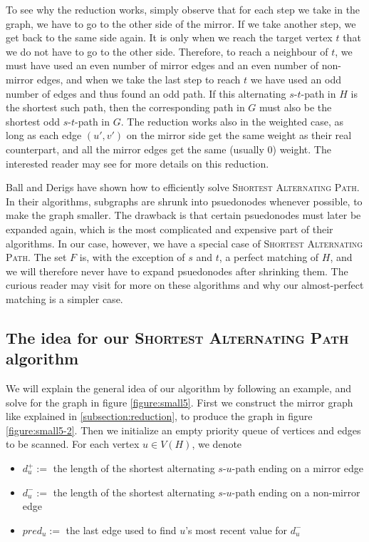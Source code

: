 To see why the reduction works, simply observe that for each step we take in the graph, we have to go to the other side of the mirror. If we take another step, we get back to the same side again. It is only when we reach the target vertex $t$ that we do not have to go to the other side. Therefore, to reach a neighbour of $t$, we must have used an even number of mirror edges and an even number of non-mirror edges, and when we take the last step to reach $t$ we have used an odd number of edges and thus found an odd path. If this alternating $s$-$t$-path in $H$ is the shortest such path, then the corresponding path in $G$ must also be the shortest odd $s$-$t$-path in $G$. The reduction works also in the weighted case, as long as each edge $(u',v')$ on the mirror side get the same weight as their real counterpart, and all the mirror edges get the same (usually 0) weight. The interested reader may see \cite{source:derigs_shortest_odd_path} for more details on this reduction.

Ball and Derigs \cite{source:shortest_alternating_path} have shown how to efficiently solve \textsc{Shortest Alternating Path}. In their algorithms, subgraphs are shrunk into psuedonodes whenever possible, to make the graph smaller. The drawback is that certain psuedonodes must later be expanded again, which is the most complicated and expensive part of their algorithms. In our case, however, we have a special case of \textsc{Shortest Alternating Path}. The set $F$ is, with the exception of $s$ and $t$, a perfect matching of $H$, and we will therefore never have to expand psuedonodes after shrinking them. The curious reader may visit \cite{source:shortest_alternating_path} for more on these algorithms and why our almost-perfect matching is a simpler case.

\subsection{The idea for our \textsc{Shortest Alternating Path} algorithm}
We will explain the general idea of our algorithm by following an example, and solve for the graph in figure \ref{figure:small5}. First we construct the mirror graph like explained in \ref{subsection:reduction}, to produce the graph in figure \ref{figure:small5-2}. Then we initialize an empty priority queue of vertices and edges to be scanned. For each vertex $u \in V(H)$, we denote
\begin{itemize}
    \item $d^+_u :=$ the length of the shortest alternating $s$-$u$-path ending on a mirror edge
    \item $d^-_u :=$ the length of the shortest alternating $s$-$u$-path ending on a non-mirror edge
    \item $pred_u :=$ the last edge used to find $u$'s most recent value for $d^-_u$
\end{itemize}

